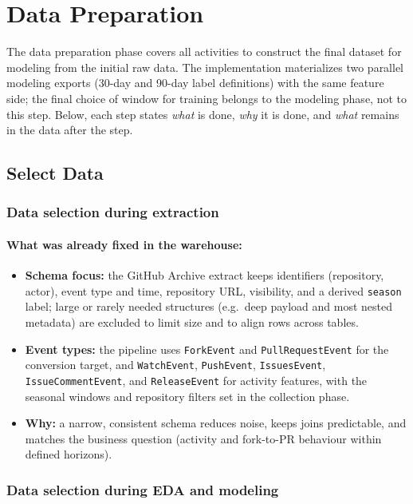 \section{Data Preparation}

The data preparation phase covers all activities to construct the final dataset for modeling from the initial raw data. The implementation materializes two parallel modeling exports (30-day and 90-day label definitions) with the same feature side; the final choice of window for training belongs to the modeling phase, not to this step. Below, each step states \emph{what} is done, \emph{why} it is done, and \emph{what} remains in the data after the step.

\subsection{Select Data}

\subsubsection{Data selection during extraction}

\paragraph{What was already fixed in the warehouse:}
\begin{itemize}
  \item \textbf{Schema focus:} the GitHub Archive extract keeps identifiers (repository, actor), event type and time, repository URL, visibility, and a derived \texttt{season} label; large or rarely needed structures (e.g.\ deep payload and most nested metadata) are excluded to limit size and to align rows across tables.
  \item \textbf{Event types:} the pipeline uses \texttt{ForkEvent} and \texttt{PullRequestEvent} for the conversion target, and \texttt{WatchEvent}, \texttt{PushEvent}, \texttt{IssuesEvent}, \texttt{IssueCommentEvent}, and \texttt{ReleaseEvent} for activity features, with the seasonal windows and repository filters set in the collection phase.
  \item \textbf{Why:} a narrow, consistent schema reduces noise, keeps joins predictable, and matches the business question (activity and fork-to-PR behaviour within defined horizons).
\end{itemize}

\subsubsection{Data selection during EDA and modeling}

